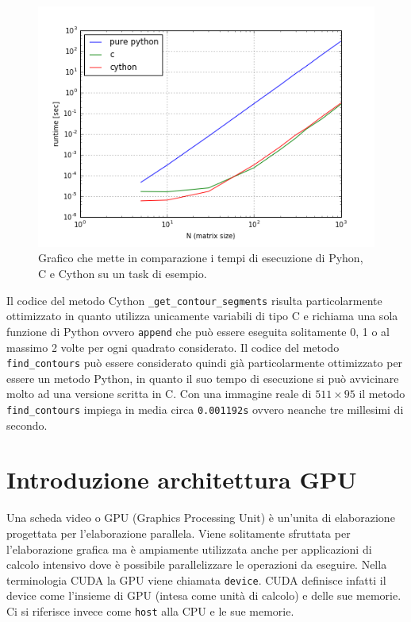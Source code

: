 \documentclass[12pt,a4paper]{report}
\begin{document}
\begin{figure}[H]
    \centering
    \includegraphics[scale=0.9]{img/cython-vs-c.png}
    \caption{Grafico che mette in comparazione i tempi di esecuzione di Pyhon, C e Cython su un task di esempio. 
}
\end{figure} 
Il codice del metodo Cython \verb|_get_contour_segments| risulta particolarmente ottimizzato in quanto utilizza unicamente variabili di tipo C e richiama una sola funzione di Python ovvero \verb|append| che può essere eseguita solitamente 0, 1 o al massimo 2 volte per ogni quadrato considerato. 
Il codice del metodo \verb|find_contours| può essere considerato quindi già particolarmente ottimizzato per essere un metodo Python, in quanto il suo tempo di esecuzione si può avvicinare molto ad una versione scritta in C. \newline
Con una immagine reale di $511\times 95$ il metodo \verb|find_contours| impiega in media circa \verb|0.001192s| %
ovvero neanche tre millesimi di secondo.

\section{Introduzione architettura GPU}
Una scheda video o GPU (Graphics Processing Unit) è un'unita di elaborazione progettata per l'elaborazione parallela. Viene solitamente sfruttata per l'elaborazione grafica ma è ampiamente utilizzata anche per applicazioni di calcolo intensivo dove è possibile parallelizzare le operazioni da eseguire. \newline
Nella terminologia CUDA la GPU viene chiamata \verb|device|. CUDA definisce infatti il device come l'insieme di GPU (intesa come unità di calcolo) e delle sue memorie. Ci si riferisce invece come \verb|host| alla CPU e le sue memorie. \newline
\end{document}
